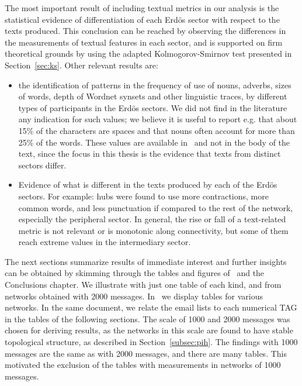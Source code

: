   The most important result of including textual metrics in our analysis is the
  statistical evidence of differentiation of each Erd\"os sector with respect to the texts produced.
  This conclusion can be reached by observing the differences in the measurements of textual features in
  each sector, and is supported on firm theoretical grounds by using the adapted Kolmogorov-Smirnov test presented in Section~\ref{sec:ks}.
  Other relevant results are:
  \begin{itemize}
\item the identification of patterns in the frequency of use of nouns, adverbs, sizes of words, depth of Wordnet synsets and other linguistic traces, by different types of participants in the Erd\"os sectors. We did not find in the literature any indication for such values; we believe it is useful to report e.g. that about 15\% of the characters are spaces and that nouns often account for more than 25\% of the words.
These values are available in~\cite{textTables} and not in the body of the text,
		  since the focus in this thesis is the evidence that texts from distinct sectors differ.
\item Evidence of what is different in the texts produced by each of the Erd\"os sectors. For example: hubs were found to use more contractions,
more common words, and less punctuation if compared to the rest of the network,
especially the peripheral sector.
In general, the rise or fall of a text-related metric is not relevant or is monotonic along connectivity,
but some of them reach extreme values in the intermediary sector.
\end{itemize}

	The next sections summarize results of immediate interest
and further insights can be obtained by skimming through
the tables and figures of~\cite{stab,textTables} and the Conclusions chapter.
We illustrate with just one table of each kind,
and from networks obtained with 2000 messages.
In~\cite{textTables} we display tables for various networks.
In the same document, we relate the email lists to each numerical
TAG in the tables of the following sections.
The scale of 1000 and 2000 messages was chosen for deriving results,
as the networks in this scale are found to have stable topological structure,
as described in Section~\ref{subsec:pih}.
The findings with 1000 messages are the same as with 2000 messages,
and there are many tables.
This motivated the exclusion of the tables with measurements in
networks of 1000 messages.

